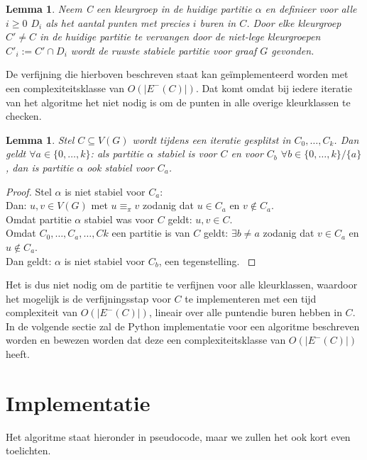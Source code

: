 \documentclass[twoside]{article}
\newtheorem{lemma}[theorem]{Lemma}
\begin{document}
\begin{multicols}{2}
\begin{lemma}
Neem C een kleurgroep in de huidige partitie $\alpha$ en definieer voor alle $i \geq 0$ $D_{i}$ als het aantal punten met precies $i$ buren in $C$. Door elke kleurgroep $C' \neq C$ in de huidige partitie te vervangen door de niet-lege kleurgroepen $C'_{i} := C'\cap D_{i}$ wordt de ruwste stabiele partitie voor graaf $G$ gevonden.
\cite{slides_DFA}
\end{lemma}

De verfijning die hierboven beschreven staat kan ge\"implementeerd worden met een complexiteitsklasse van $O(|E^{-}(C)|)$. Dat komt omdat bij iedere iteratie van het algoritme het niet nodig is om de punten in alle overige kleurklassen te checken.

\begin{lemma}
Stel $C \subseteq V(G)$ wordt tijdens een iteratie gesplitst in $C_{0}, \ldots, C_{k}$. Dan geldt $\forall a \in \{0,\ldots,k\}$: als partitie $\alpha$ stabiel is voor $C$ en voor $C_{b}$ $\forall b \in \{0,\ldots,k\}/\{a\}$, dan is partitie $\alpha$ ook stabiel voor $C_{a}$.
\end{lemma}

\begin{proof}
Stel $\alpha$ is niet stabiel voor $C_{a}$:\\
Dan: $ u,v \in V(G)$ met $u \equiv_{\pi} v$ zodanig dat $u \in C_{a}$ en $v \not \in C_{a}$.\\
Omdat partitie $\alpha$ stabiel was voor $C$ geldt: $u,v \in C$.\\
Omdat $C_{0},\ldots,C_{a},\ldots,C{k}$ een partitie is van $C$ geldt: $\exists b \neq a $ zodanig dat $v \in C_{a}$ en $u \not \in C_{a}$.\\
Dan geldt: $\alpha$ is niet stabiel voor $C_{b}$, een tegenstelling.
\cite{slides_DFA}
\end{proof}

Het is dus niet nodig om de partitie te verfijnen voor alle kleurklassen, waardoor het mogelijk is de verfijningsstap voor $C$ te implementeren met een tijd complexiteit van $O(|E^{-}(C)|)$, lineair over alle puntendie buren hebben in $C$. In de volgende sectie zal de Python implementatie voor een algoritme beschreven worden en bewezen worden dat deze een complexiteitsklasse van $O(|E^{-}(C)|)$ heeft.

\section{Implementatie}
Het algoritme staat hieronder in pseudocode, maar we zullen het ook kort even toelichten.


\end{multicols}
\end{document}
